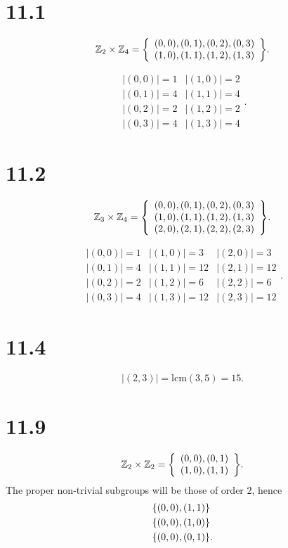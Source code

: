 \documentclass[12pt]{extarticle}
\begin{document}
\DeclarePairedDelimiter\bangle\langle\rangle


\section*{11.1}
\[
	\mathbb{Z}_2 \times \mathbb{Z}_4 = 
	\qty{\begin{array}{l}
		(0,0), (0,1), (0,2), (0,3) \\
		(1,0), (1,1), (1,2), (1,3)
	\end{array}}
.\]

\[
	\begin{array}{ll}
		|(0,0)| = 1 & |(1,0)| = 2 \\
		|(0,1)| = 4 & |(1,1)| = 4 \\
		|(0,2)| = 2 & |(1,2)| = 2 \\
		|(0,3)| = 4 & |(1,3)| = 4
	\end{array}
.\]

\section*{11.2}
\[
	\mathbb{Z}_3 \times \mathbb{Z}_4 = 
	\qty{\begin{array}{l}
		(0,0), (0,1), (0,2), (0,3) \\
		(1,0), (1,1), (1,2), (1,3) \\
		(2,0), (2,1), (2,2), (2,3)
	\end{array}}
.\]

\[
	\begin{array}{lll}
		|(0,0)| = 1 & |(1,0)| = 3  & |(2,0)| = 3 \\
		|(0,1)| = 4 & |(1,1)| = 12 & |(2,1)| = 12 \\
		|(0,2)| = 2 & |(1,2)| = 6  & |(2,2)| = 6 \\
		|(0,3)| = 4 & |(1,3)| = 12 & |(2,3)| = 12
	\end{array}
.\]

\section*{11.4}
\[
	|(2,3)| = \text{lcm}(3, 5) = 15
.\]

\section*{11.9}
\[
	\mathbb{Z}_2 \times \mathbb{Z}_2 = 
	\qty{\begin{array}{l}
		(0,0), (0,1) \\
		(1,0), (1,1)
	\end{array}}
.\]
The proper non-trivial subgroups will be those of order $2$, hence
\begin{align*}
	&\qty{(0,0), (1,1)} \\
	&\qty{(0,0), (1,0)} \\
	&\qty{(0,0), (0,1)}
.\end{align*}
\end{document}
